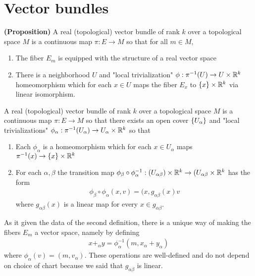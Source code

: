 \documentclass[12pt]{article}
\begin{document}
\section{Vector bundles}
\begin{definition}
\textbf{(Proposition)} A real (topological) vector bundle of rank $k$ over a topological space $M$ is a continuous map $\pi:E\to M$ so that for all $m\in M$,\begin{enumerate}
    \item The fiber $E_m$ is equipped with the structure of a real vector space
    \item There is a neighborhood $U$ and "local trivialization" $\phi:\pi^{-1}(U)\to U\times \mathbb{R}^k$ homeomorphism which for each $x\in U$ maps the fiber $E_x$ to $\{x\}\times\mathbb{R}^k$ via linear isomorphism.
\end{enumerate}

A real (topological) vector bundle of rank $k$ over a topological space $M$ is a continuous map $\pi:E\to M$ so that there exists an open cover $\{U_\alpha\}$ and "local trivializations" $\phi_\alpha:\pi^{-1}(U_\alpha)\to U_\alpha\times\mathbb{R}^k$ so that \begin{enumerate}
    \item Each $\phi_\alpha$ is a homeomorphism which for each $x\in U_\alpha$ maps $\pi^{-1}(x)\to \{x\}\times\mathbb{R}^k$
    \item For each $\alpha,\beta$ the transition map $\phi_{\beta}\circ\phi_\alpha^{-1}:(U_{\alpha\beta})\times\mathbb{R}^k\to(U_{\alpha\beta}\times\mathbb{R}^k$ has the form \begin{align*}
        \phi_{\beta}\circ\phi_\alpha(x,v) = (x,g_{\alpha\beta}(x)v
    \end{align*} where $g_{\alpha\beta}(x)$ is a linear map for every $x\in g_{\alpha\beta}$.
\end{enumerate}

As it given the data of the second definition, there is a unique way of making the fibers $E_m$ a vector space, namely by defining \begin{align*}
    x +_\alpha y = \phi_\alpha^{-1}(m,x_\alpha + y_\alpha)
\end{align*} where $\phi_\alpha(v) = (m,v_\alpha)$.
These operations are well-defined and do not depend on choice of chart because we said that $g_{\alpha\beta}$ is linear.
\end{definition}
\end{document}
